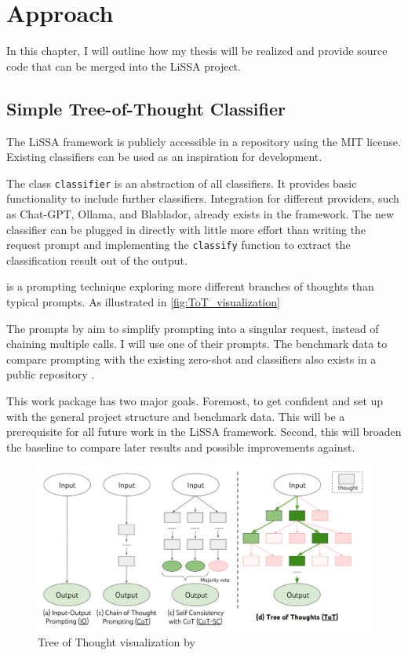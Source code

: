 \chapter{Approach}
In this chapter, I will outline how my thesis will be realized and provide source code that can be merged into the LiSSA project.


\section{Simple Tree-of-Thought Classifier}
\label{approach:sec:tot}
The LiSSA framework is publicly accessible in a repository using the MIT license. Existing classifiers can be used as an inspiration for development. 

The class \verb|classifier| is an abstraction of all classifiers. It provides basic functionality to include further classifiers. Integration for different \LLM providers, such as Chat-GPT, Ollama, and Blablador, already exists in the framework. The new classifier can be plugged in directly with little more effort than writing the request prompt and implementing the \verb|classify| function to extract the classification result out of the \LLM output.

\ToT is a prompting technique exploring more different branches of thoughts than typical \CoT prompts. As illustrated in \autoref{fig:ToT_visualization} 

The prompts by  aim to simplify \ToT prompting into a singular request, instead of chaining multiple calls. I will use one of their prompts. The benchmark data to compare \ToT prompting with the existing zero-shot and \CoT classifiers also exists in a public repository \cite{fuchss2022ArDoCoBenchmark}. 

This work package has two major goals. Foremost, to get confident and set up with the general project structure and benchmark data. This will be a prerequisite for all future work in the LiSSA framework. Second, this will broaden the baseline to compare later results and possible improvements against.

\begin{figure}
    \centering
    \includegraphics[width=\linewidth]{graphics/ToT_Yao.png}
    \caption{Tree of Thought visualization by }
    \label{fig:ToT_visualization}
\end{figure}


